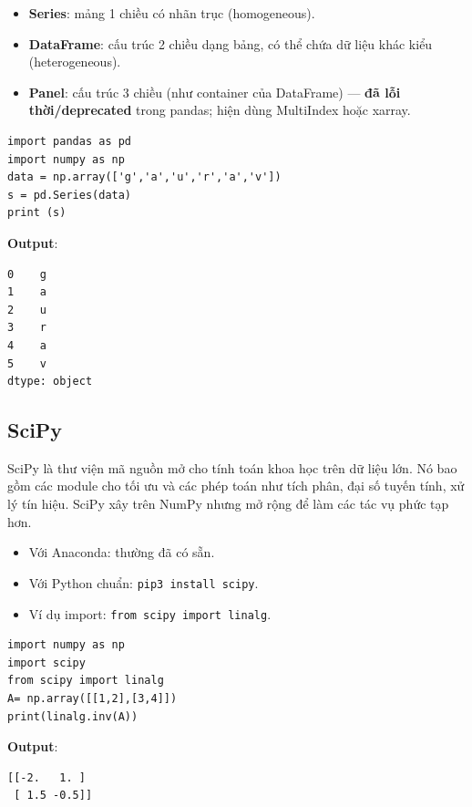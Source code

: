 \begin{dinhnghia}[title={Các cấu trúc dữ liệu trong Pandas}]
\begin{itemize}
  \item \textbf{Series}: mảng 1 chiều có nhãn trục (homogeneous).
  \item \textbf{DataFrame}: cấu trúc 2 chiều dạng bảng, có thể chứa dữ liệu khác kiểu (heterogeneous).
  \item \textbf{Panel}: cấu trúc 3 chiều (như container của DataFrame) --- \textbf{đã lỗi thời/deprecated} trong pandas; hiện dùng MultiIndex hoặc xarray.
\end{itemize}
\end{dinhnghia}

\begin{vidu}[title={Ví dụ: Series từ ndarray}]
\begin{lstlisting}
import pandas as pd
import numpy as np
data = np.array(['g','a','u','r','a','v'])
s = pd.Series(data)
print (s)
\end{lstlisting}

\textbf{Output}:
\begin{lstlisting}
0    g
1    a
2    u
3    r
4    a
5    v
dtype: object
\end{lstlisting}
\end{vidu}

\subsection{SciPy}

\begin{dinhnghia}[title={SciPy}]
SciPy là thư viện mã nguồn mở cho tính toán khoa học trên dữ liệu lớn.
Nó bao gồm các module cho tối ưu và các phép toán như tích phân, đại số tuyến tính, xử lý tín hiệu.
SciPy xây trên NumPy nhưng mở rộng để làm các tác vụ phức tạp hơn.
\end{dinhnghia}

\begin{phuongphap}[title={Cài đặt/nhập}]
\begin{itemize}
  \item Với Anaconda: thường đã có sẵn.
  \item Với Python chuẩn: \texttt{pip3 install scipy}.
  \item Ví dụ import: \texttt{from scipy import linalg}.
\end{itemize}
\end{phuongphap}

\begin{vidu}[title={Ví dụ: nghịch đảo ma trận}]
\begin{lstlisting}
import numpy as np
import scipy
from scipy import linalg
A= np.array([[1,2],[3,4]])
print(linalg.inv(A))
\end{lstlisting}

\textbf{Output}:
\begin{lstlisting}
[[-2.   1. ]
 [ 1.5 -0.5]]
\end{lstlisting}
\end{vidu}

